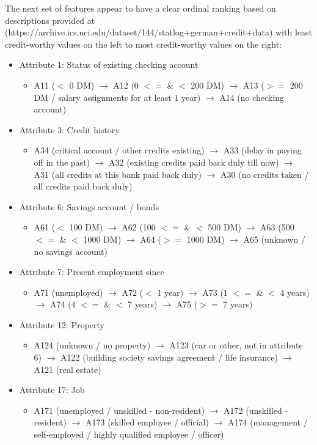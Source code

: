 \documentclass{article}
\begin{document}
    The next set of features appear to have a clear ordinal ranking based on descriptions provided at (https://archive.ics.uci.edu/dataset/144/statlog+german+credit+data)
    with least credit-worthy values on the left to most credit-worthy values on the right:
    \begin{itemize}
        \item Attribute 1: Status of existing checking account
        \begin{itemize}
            \item A11 ($<$ 0 DM) $\to$ A12 (0 $<=$ \& $<$ 200 DM) $\to$ A13 ($>=$ 200 DM / salary assignments for at least 1 year) $\to$ A14 (no checking account)
        \end{itemize}
        \item Attribute 3: Credit history
        \begin{itemize}
            \item A34 (critical account / other credits existing) $\to$ A33 (delay in paying off in the past) $\to$ A32 (existing credits paid back duly till now) $\to$ A31 (all credits at this bank paid back duly) $\to$ A30 (no credits taken / all credits paid back duly)
        \end{itemize}
        \item Attribute 6: Savings account / bonds
        \begin{itemize}
            \item A61 ($<$ 100 DM) $\to$ A62 (100 $<=$ \& $<$ 500 DM) $\to$ A63 (500 $<=$ \& $<$ 1000 DM) $\to$ A64 ($>=$ 1000 DM) $\to$ A65 (unknown / no savings account)
        \end{itemize}
        \item Attribute 7: Present employment since
        \begin{itemize}
            \item A71 (unemployed) $\to$ A72 ($<$ 1 year) $\to$ A73 (1 $<=$ \& $<$ 4 years) $\to$ A74 (4 $<=$ \& $<$ 7 years) $\to$ A75 ($>=$ 7 years)
        \end{itemize}
        \item Attribute 12: Property
        \begin{itemize}
            \item A124 (unknown / no property) $\to$ A123 (car or other, not in attribute 6) $\to$ A122 (building society savings agreement / life insurance) $\to$ A121 (real estate)
        \end{itemize}
        \item Attribute 17: Job
        \begin{itemize}
            \item A171 (unemployed / unskilled - non-resident) $\to$ A172 (unskilled - resident) $\to$ A173 (skilled employee / official) $\to$ A174 (management / self-employed / highly qualified employee / officer)
        \end{itemize}
    \end{itemize}
\end{document}
